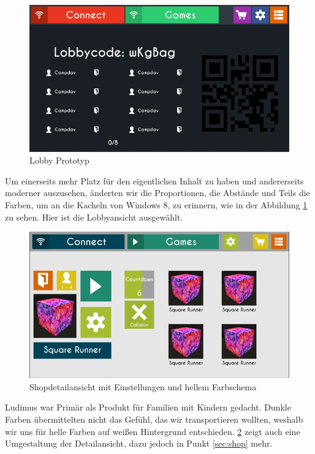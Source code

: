 \begin{center}
    \begin{figure}
        \includegraphics[scale=0.7]{images/design02.png} 
        \caption{Lobby Prototyp}
        \label{img:design02}
    \end{figure}
\end{center}
Um einerseits mehr Platz für den eigentlichen Inhalt zu haben und andererseits moderner auszusehen, änderten wir die Proportionen, die Abstände und Teils die Farben, um an die Kacheln von Windows 8, zu erinnern, wie in der Abbildung \ref{img:design02} zu sehen. Hier ist die Lobbyansicht ausgewählt. 
\newline
\begin{center}
    \begin{figure}
        \includegraphics[scale=0.7]{images/design03.png} 
        \caption{Shopdetailansicht mit Einstellungen und hellem Farbschema}
        \label{img:design03}
    \end{figure}
\end{center}
Ludimus war Primär als Produkt für Familien mit Kindern gedacht. Dunkle Farben übermittelten nicht das Gefühl, das wir transportieren wollten, weshalb wir uns für helle Farben auf weißen Hintergrund entschieden. \ref{img:design03} zeigt auch eine Umgestaltung der Detailansicht, dazu jedoch in Punkt \ref{sec:shop} mehr.
